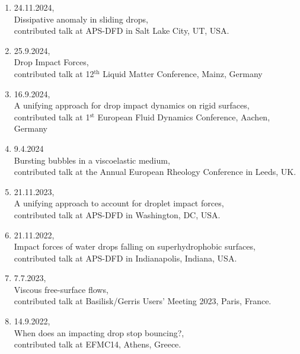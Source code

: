 \documentclass[11pt,a4paper,roman,english,colorlinks,linkcolor={red!50!black}]{moderncv}
\begin{document}
\begin{enumerate}[leftmargin=0.75cm]
	\item 24.11.2024,\\
	Dissipative anomaly in sliding drops,\\
	contributed talk at APS-DFD in Salt Lake City, UT, USA.

	\item 25.9.2024,\\
	Drop Impact Forces,\\
	contributed talk at 12$^\text{th}$ Liquid Matter Conference, Mainz, Germany

	\item 16.9.2024,\\
	A unifying approach for drop impact dynamics on rigid surfaces,\\
	contributed talk at 1$^\text{st}$ European Fluid Dynamics Conference, Aachen, Germany

	\item 9.4.2024\\
	Bursting bubbles in a viscoelastic medium,\\
	contributed talk at the Annual European Rheology Conference in Leeds, UK.
	
	\item 21.11.2023,\\
	A unifying approach to account for droplet impact forces,\\
	contributed talk at APS-DFD in Washington, DC, USA.

	\item 21.11.2022,\\
	Impact forces of water drops falling on superhydrophobic surfaces,\\
	contributed talk at APS-DFD in Indianapolis, Indiana, USA.

	\item 7.7.2023,\\
	Viscous free-surface flows,\\
	contributed talk at Basilisk/Gerris Users' Meeting 2023, Paris, France.

	\item 14.9.2022,\\
	When does an impacting drop stop bouncing?,\\
	contributed talk at EFMC14, Athens, Greece.



\end{enumerate}
\end{document}
